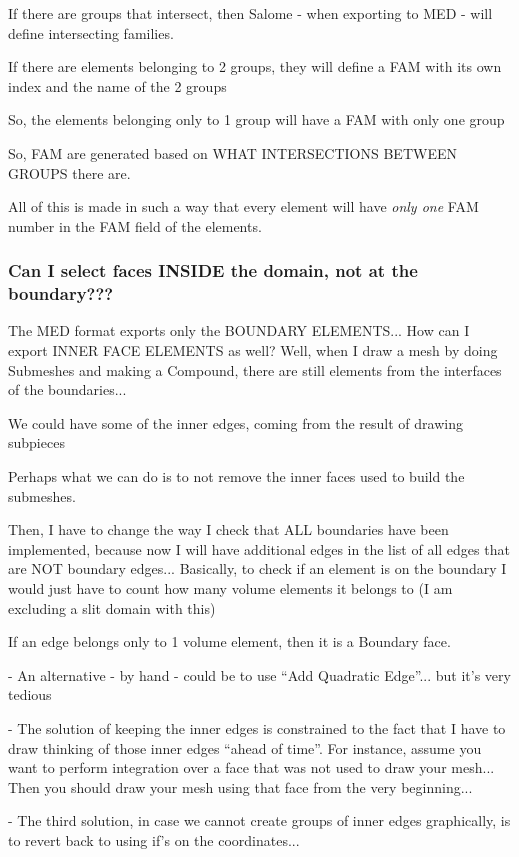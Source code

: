 \documentclass[10pt]{book}
\begin{document}
 If there are groups that intersect, then Salome - when exporting to MED - 
 will define intersecting families. 
 
 If there are elements belonging to 2 groups,
 they will define a FAM with its own index and the name of the 2 groups
 
 So, the elements belonging only to 1 group will have a FAM with only one group
 
 So, FAM are generated based on WHAT INTERSECTIONS BETWEEN GROUPS there are.
 
 All of this is made in such a way that every element 
 will have \textit{only one} FAM number in the FAM field of the elements.
 

\subsubsection{Can I select faces INSIDE the domain, not at the boundary???}

 The MED format exports only the BOUNDARY ELEMENTS...
 How can I export INNER FACE ELEMENTS as well?
 Well, when I draw a mesh by doing Submeshes and making a Compound,
 there are still elements from the interfaces of the boundaries...
 
 We could have some of the inner edges, coming from the result of drawing subpieces 

 Perhaps what we can do is to not remove the inner faces used to build the submeshes.
 
 Then, I have to change the way I check that ALL boundaries have been implemented,
 because now I will have additional edges in the list of all edges
 that are NOT boundary edges...
 Basically, to check if an element is on the boundary I would 
 just have to count how many volume elements it belongs to
 (I am excluding a slit domain with this)
 
 If an edge belongs only to 1 volume element, then it is a Boundary face.
 
 
 - An alternative - by hand - could be to use ``Add Quadratic Edge''... but it's very tedious
 
 - The solution of keeping the inner edges is constrained to the fact 
   that I have to draw thinking of those inner edges ``ahead of time''.
   For instance, assume you want to perform integration over a face 
   that was not used to draw your mesh... 
   Then you should draw your mesh using that face from the very beginning...
   
 - The third solution, in case we cannot create groups of inner edges graphically,
    is to revert back to using if's on the coordinates...  
 
\end{document}
